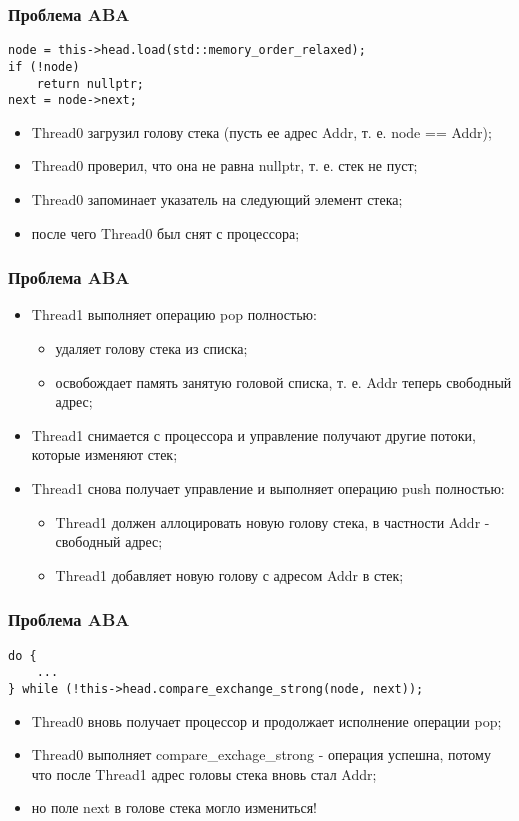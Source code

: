 \begin{frame}[fragile]
\frametitle{Проблема ABA}

\begin{lstlisting}
node = this->head.load(std::memory_order_relaxed);
if (!node)
    return nullptr;
next = node->next;
\end{lstlisting}

\begin{itemize}
  \item Thread0 загрузил голову стека (пусть ее адрес Addr, т. е. node == Addr);
  \item Thread0 проверил, что она не равна nullptr, т. е. стек не пуст;
  \item Thread0 запоминает указатель на следующий элемент стека;
  \item после чего Thread0 был снят с процессора;
\end{itemize}
\end{frame}

\begin{frame}
\frametitle{Проблема ABA}

\begin{itemize}
  \item Thread1 выполняет операцию pop полностью:
    \begin{itemize}
      \item удаляет голову стека из списка;
      \item освобождает память занятую головой списка, т. е. Addr теперь свободный адрес;
    \end{itemize}
  \item Thread1 снимается с процессора и управление получают другие потоки, которые изменяют стек;
  \item Thread1 снова получает управление и выполняет операцию push полностью:
    \begin{itemize}
      \item Thread1 должен аллоцировать новую голову стека, в частности Addr - свободный адрес;
      \item Thread1 добавляет новую голову с адресом Addr в стек;
    \end{itemize}
\end{itemize}
\end{frame}

\begin{frame}[fragile]
\frametitle{Проблема ABA}

\begin{lstlisting}
do {
    ...
} while (!this->head.compare_exchange_strong(node, next));
\end{lstlisting}

\begin{itemize}
  \item Thread0 вновь получает процессор и продолжает исполнение операции pop;
  \item Thread0 выполняет compare\_exchage\_strong - операция успешна, потому что после Thread1 адрес головы стека вновь стал Addr;
  \item<2-> но поле next в голове стека могло измениться!
\end{itemize}
\end{frame}
